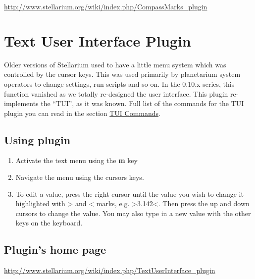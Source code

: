 \url{http://www.stellarium.org/wiki/index.php/CompassMarks_plugin}

\section{Text User Interface Plugin}\label{text-user-interface-plugin}


Older versions of Stellarium used to have a little menu system which was
controlled by the cursor keys. This was used primarily by planetarium
system operators to change settings, run scripts and so on. In the
0.10.x series, this function vanished as we totally re-designed the user
interface. This plugin re-implements the ``TUI'', as it was known. Full
list of the commands for the TUI plugin you can read in the section
\href{TUI_Commands}{TUI Commands}.

\subsection{Using plugin}\label{using-plugin-3}

\begin{enumerate}
\item
  Activate the text menu using the \textbf{m} key
\item
  Navigate the menu using the cursors keys.
\item
  To edit a value, press the right cursor until the value you wish to
  change it highlighted with \textgreater{} and \textless{} marks, e.g.
  \textgreater{}3.142\textless{}. Then press the up and down cursors to
  change the value. You may also type in a new value with the other keys
  on the keyboard.
\end{enumerate}

\subsection{Plugin's home page}\label{plugins-home-page-3}

\url{http://www.stellarium.org/wiki/index.php/TextUserInterface_plugin}

